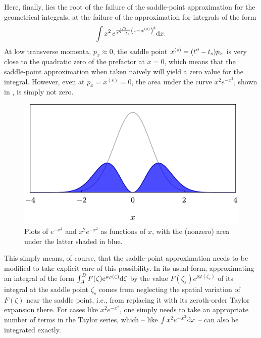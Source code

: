 Here, finally, lies the root of the failure of the saddle-point approximation for the geometrical integrals, at the failure of the approximation for integrals of the form
\begin{equation}
\int 
x^2 \,
e^{\frac{i/2}{t''-{t_s}}\left(x-x^{(s)}\right)^2}
\mathrm{d} x
.
\end{equation}
At low transverse momenta, $p_x\approx 0$, the saddle point $x^{(s)}=(t''-{t_s})p_x$ is very close to the quadratic zero of the prefactor at $x=0$, which means that the saddle-point approximation when taken naively will yield a zero value for the integral. However, even at $p_x=x^{(s)}=0$, the area under the curve $x^2e^{-x^2}$, shown in , is simply not zero.


\begin{figure}[htb]
  \centering
  \includegraphics[scale=1]{3-Multi-channel/Figures/figure3A.pdf}
  \caption[Plots of $e^{-x^2}$ and $x^2e^{-x^2}$ as functions of $x$]{Plots of $e^{-x^2}$ and $x^2e^{-x^2}$ as functions of $x$, with the (nonzero) area under the latter shaded in blue.}
  \label{f3-gaussian-with-node}
\end{figure}



This simply means, of course, that the saddle-point approximation needs to be modified to take explicit care of this possibility. In its usual form, approximating an integral of the form $\int_A^B F(\zeta) e^{\rho \varphi(\zeta)} \mathrm{d}\zeta$ by the value $F(\zeta_s) e^{\rho\varphi(\zeta_s)}$ of its integral at the saddle point $\zeta_s$ comes from neglecting the spatial variation of $F(\zeta)$ near the saddle point, i.e., from replacing it with its zeroth-order Taylor expansion there. For cases like $x^2e^{-x^2}$, one simply needs to take an appropriate number of terms in the Taylor series, which -- like $\int x^2 e^{-x^2} \mathrm{d} x$ -- can also be integrated exactly.






